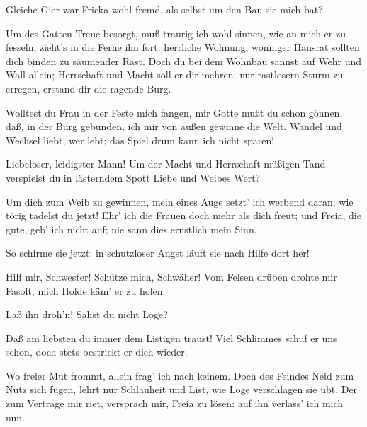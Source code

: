 \begin{drama}
\Wotanspeaks


Gleiche Gier war Fricka wohl fremd,
als selbst um den Bau sie mich bat?
 

\Frickaspeaks
Um des Gatten Treue besorgt,
muß traurig ich wohl sinnen,
wie an mich er zu fesseln,
zieht's in die Ferne ihn fort:
herrliche Wohnung, wonniger Hausrat
sollten dich binden zu säumender Rast.
Doch du bei dem Wohnbau sannst auf Wehr und Wall allein;
Herrschaft und Macht soll er dir mehren;
nur rastlosern Sturm zu erregen,
erstand dir die ragende Burg.
 

\Wotanspeaks


Wolltest du Frau in der Feste mich fangen,
mir Gotte mußt du schon gönnen,
daß, in der Burg gebunden, ich mir
von außen gewinne die Welt.
Wandel und Wechsel liebt, wer lebt;
das Spiel drum kann ich nicht sparen!
 

\Frickaspeaks
Liebeloser, leidigster Mann!
Um der Macht und Herrschaft müßigen Tand
verspielst du in lästerndem Spott
Liebe und Weibes Wert?
 

\Wotanspeaks


Um dich zum Weib zu gewinnen,
mein eines Auge setzt' ich werbend daran;
wie törig tadelst du jetzt!
Ehr' ich die Frauen doch mehr als dich freut;
und Freia, die gute, geb' ich nicht auf;
nie sann dies ernstlich mein Sinn.
 

\Frickaspeaks


So schirme sie jetzt: in schutzloser Angst
läuft sie nach Hilfe dort her!
 

\Freiaspeaks


Hilf mir, Schwester! Schütze mich, Schwäher!
Vom Felsen drüben drohte mir Fasolt,
mich Holde käm' er zu holen.
 

\Wotanspeaks
Laß ihn droh'n! Sahst du nicht Loge?
 

\Frickaspeaks
Daß am liebsten du immer dem Listigen traust!
Viel Schlimmes schuf er uns schon,
doch stets bestrickt er dich wieder.
 

\Wotanspeaks
Wo freier Mut frommt,
allein frag' ich nach keinem.
Doch des Feindes Neid zum Nutz sich fügen,
lehrt nur Schlauheit und List,
wie Loge verschlagen sie übt.
Der zum Vertrage mir riet,
versprach mir, Freia zu lösen:
auf ihn verlass' ich mich nun.
 


\end{drama}

